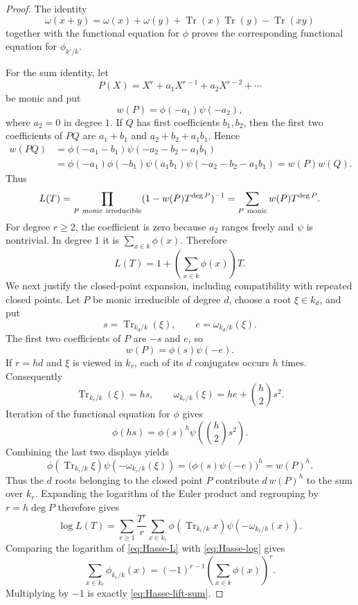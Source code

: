\documentclass[11pt]{amsart}
\theoremstyle{definition}
\theoremstyle{remark}
\newcommand{\Tr}{\operatorname{Tr}}
\begin{document}
\begin{proof}
The identity
\[
 \omega(x+y)=\omega(x)+\omega(y)+\Tr(x)\Tr(y)-\Tr(xy)
\]
together with the functional equation for $\phi$ proves the corresponding
functional equation for $\phi_{k'/k}$.

For the sum identity, let
\[
 P(X)=X^r+a_1X^{r-1}+a_2X^{r-2}+\cdots
\]
be monic and put
\[
 w(P)=\phi(-a_1)\psi(-a_2),
\]
where $a_2=0$ in degree $1$.  If $Q$ has first coefficients $b_1,b_2$,
then the first two coefficients of $PQ$ are
$a_1+b_1$ and $a_2+b_2+a_1b_1$.  Hence
\begin{align*}
 w(PQ)
 &=\phi(-a_1-b_1)\psi(-a_2-b_2-a_1b_1)\\
 &=\phi(-a_1)\phi(-b_1)\psi(a_1b_1)
   \psi(-a_2-b_2-a_1b_1)=w(P)w(Q).
\end{align*}
Thus
\[
 L(T)=\prod_{P\ {\rm monic\ irreducible}}
       (1-w(P)T^{\deg P})^{-1}
     =\sum_{P\ {\rm monic}}w(P)T^{\deg P}.
\]
For degree $r\ge2$, the coefficient is zero because $a_2$ ranges freely
and $\psi$ is nontrivial.  In degree $1$ it is $\sum_{x\in k}\phi(x)$.
Therefore
\begin{equation}\label{eq:Hasse-L}
 L(T)=1+\left(\sum_{x\in k}\phi(x)\right)T.
\end{equation}
We next justify the closed-point expansion, including compatibility
with repeated closed points.  Let $P$ be monic irreducible of degree
$d$, choose a root $\xi\in k_d$, and put
\[
 s=\Tr_{k_d/k}(\xi),\qquad e=\omega_{k_d/k}(\xi).
\]
The first two coefficients of $P$ are $-s$ and $e$, so
\[
 w(P)=\phi(s)\psi(-e).
\]
If $r=hd$ and $\xi$ is viewed in $k_r$, each of its $d$ conjugates
occurs $h$ times.  Consequently
\begin{equation}\label{eq:Hasse-repeated-trace-omega}
 \Tr_{k_r/k}(\xi)=hs,
 \qquad
 \omega_{k_r/k}(\xi)=he+\binom h2s^2.
\end{equation}
Iteration of the functional equation for $\phi$ gives
\begin{equation}\label{eq:Hasse-iterated-functional-equation}
 \phi(hs)=\phi(s)^h\psi\!\left(\binom h2s^2\right).
\end{equation}
Combining the last two displays yields
\begin{equation}\label{eq:Hasse-closed-point-compatibility}
 \phi(\Tr_{k_r/k}\xi)\psi(-\omega_{k_r/k}(\xi))
 =\bigl(\phi(s)\psi(-e)\bigr)^h=w(P)^h.
\end{equation}
Thus the $d$ roots belonging to the closed point $P$ contribute
$d\,w(P)^h$ to the sum over $k_r$.  Expanding the logarithm of the
Euler product and regrouping by $r=h\deg P$ therefore gives
\begin{equation}\label{eq:Hasse-log}
 \log L(T)
 =\sum_{r\ge1}\frac{T^r}{r}
 \sum_{x\in k_r}\phi(\Tr_{k_r/k}x)
              \psi(-\omega_{k_r/k}(x)).
\end{equation}
Comparing the logarithm of \eqref{eq:Hasse-L} with
\eqref{eq:Hasse-log} gives
\[
 \sum_{x\in k_r}\phi_{k_r/k}(x)
 =(-1)^{r-1}\left(\sum_{x\in k}\phi(x)\right)^r.
\]
Multiplying by $-1$ is exactly \eqref{eq:Hasse-lift-sum}.
\end{proof}
\end{document}
